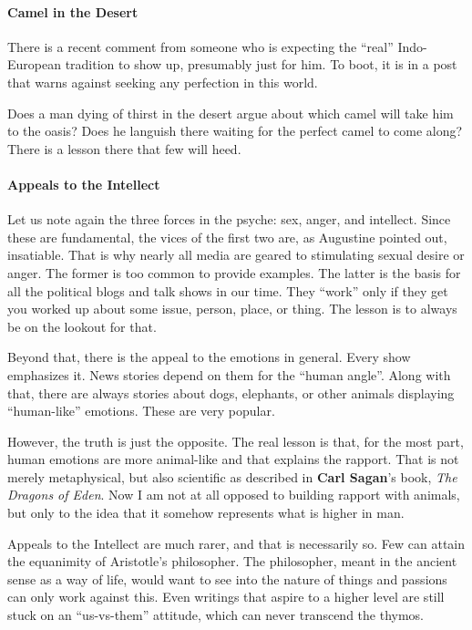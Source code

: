 \paragraph{Camel in the Desert}


There is a recent comment from someone who is expecting the ``real'' Indo-European tradition to show up, presumably just for him. To boot, it is in a post that warns against seeking any perfection in this world.

Does a man dying of thirst in the desert argue about which camel will take him to the oasis? Does he languish there waiting for the perfect camel to come along? There is a lesson there that few will heed.

\paragraph{Appeals to the Intellect}


Let us note again the three forces in the psyche: sex, anger, and intellect. Since these are fundamental, the vices of the first two are, as Augustine pointed out, insatiable. That is why nearly all media are geared to stimulating sexual desire or anger. The former is too common to provide examples. The latter is the basis for all the political blogs and talk shows in our time. They ``work'' only if they get you worked up about some issue, person, place, or thing. The lesson is to always be on the lookout for that.

Beyond that, there is the appeal to the emotions in general. Every show emphasizes it. News stories depend on them for the ``human angle''. Along with that, there are always stories about dogs, elephants, or other animals displaying ``human-like'' emotions. These are very popular.

However, the truth is just the opposite. The real lesson is that, for the most part, human emotions are more animal-like and that explains the rapport. That is not merely metaphysical, but also scientific as described in \textbf{Carl Sagan}'s book, \emph{The Dragons of Eden}. Now I am not at all opposed to building rapport with animals, but only to the idea that it somehow represents what is higher in man.

Appeals to the Intellect are much rarer, and that is necessarily so. Few can attain the equanimity of Aristotle's philosopher. The philosopher, meant in the ancient sense as a way of life, would want to see into the nature of things and passions can only work against this. Even writings that aspire to a higher level are still stuck on an ``us-vs-them'' attitude, which can never transcend the thymos.

